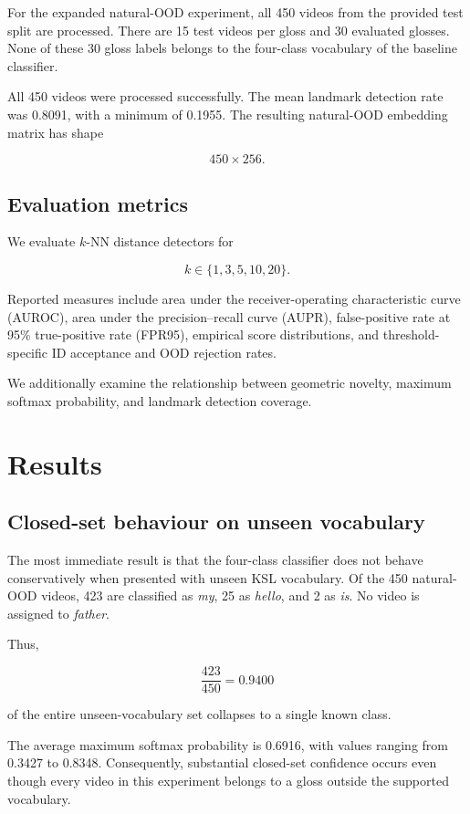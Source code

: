 \documentclass[11pt]{article}
\begin{document}
For the expanded natural-OOD experiment, all 450 videos from
the provided test split are processed. There are 15 test
videos per gloss and 30 evaluated glosses. None of these
30 gloss labels belongs to the four-class vocabulary of the
baseline classifier.

All 450 videos were processed successfully. The mean landmark
detection rate was 0.8091, with a minimum of 0.1955.
The resulting natural-OOD embedding matrix has shape

\[
450\times256.
\]


\subsection{Evaluation metrics}

We evaluate $k$-NN distance detectors for

\[
k\in\{1,3,5,10,20\}.
\]

Reported measures include area under the receiver-operating
characteristic curve (AUROC), area under the
precision--recall curve (AUPR), false-positive rate at
95\% true-positive rate (FPR95), empirical score
distributions, and threshold-specific ID acceptance and OOD
rejection rates.

We additionally examine the relationship between geometric
novelty, maximum softmax probability, and landmark detection
coverage.


\section{Results}

\subsection{Closed-set behaviour on unseen vocabulary}

The most immediate result is that the four-class classifier
does not behave conservatively when presented with unseen
KSL vocabulary. Of the 450 natural-OOD videos, 423 are
classified as \emph{my}, 25 as \emph{hello}, and 2 as
\emph{is}. No video is assigned to \emph{father}.

Thus,

\[
\frac{423}{450}
=
0.9400
\]

of the entire unseen-vocabulary set collapses to a single
known class.

The average maximum softmax probability is 0.6916, with
values ranging from 0.3427 to 0.8348. Consequently,
substantial closed-set confidence occurs even though every
video in this experiment belongs to a gloss outside the
supported vocabulary.
\end{document}
